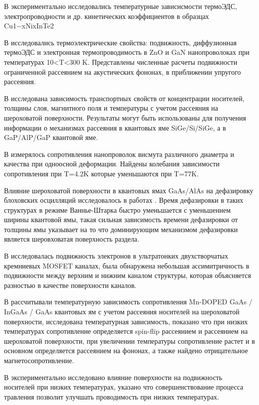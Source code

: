 В \cite{Kucek2015} экспериментально исследовались температурные зависисмости термоЭДС, электропроводности и др. кинетических коэффициентов в образцах Cu1−xNixInTe2

В \cite{Galagali2015} исследовались термоэлектрические свойства: подвижность, диффузионная термоЭДС и электронная термопроводимость в ZnO и GaN нанопроволоках при температурах 10<T<300 K. Представлены численные расчеты подвижности ограниченной рассеянием на акустических фононах, в приближении упругого рассеяния.

В \cite{Khanh2013} исследована зависимость транспортных свойств от концентрации носителей, толщины слоя, магнитного поля и температуры с учетом рассеяния на шероховатой поверхности. Результаты могут быть использованы для получения информации о механизмах рассеяния в квантовых яме SiGe/Si/SiGe, а в \cite{Tai2015} GaP/AlP/GaP квантовой яме.

В \cite{Condrea2010} измерялось сопротивления нанопроволок висмута различного диаметра и качества при одноосной деформации. Найдены колебания зависимости сопротивления при T=4.2K которые уменьшаются при T=77K.

Влияние шероховатой поверхности в квантовых ямах GaAs/AlAs на дефазировку блоховских осцилляций исследовалось в работах \cite{Unuma2006,Unuma2007}. Время дефазировки в таких структурах в режиме Ваннье-Штарка быстро уменьшается с уменьшением ширины квантовой ямы, такая сильная зависимость времени дефазировки от толщины ямы указывает на то что доминирующим механизмом дефазировки является шеровховатая поверхность раздела.

В \cite{Prunnila2005} исследовалась подвижность электронов в ультратонких двухстворчатых кремниевых MOSFET каналах, была обнаружена небольшая ассимитричность в подвижности между верхним и нижним каналом структуры, которая объясняется разностью в качестве поверхности каналов.

В \cite{Shchurova2009} рассчитывали температурную зависимость сопротивления Mn-DOPED GaAs / InGaAs / GaAs квантовых ям с учетом рассеяния носителей на шероховатой поверхности, исследована температурная зависимость, показано что при низких температурах сопротивление определяется spin-flip рассеянием и рассеянием на шероховатой поверхности, при увеличении температуры сопротивление растет и в основном определяется рассеянием на фононах, а также найдено отрицательное магнетосопротивление.

В \cite{Lee2011b} экспериментально исследовано влияние поверхности на подвижность носителей при низких температурах, указано что совершенствование процесса травления позволит улучшать проводимость при низких температурах.

